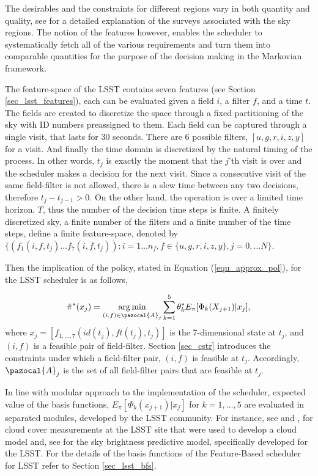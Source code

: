 \documentclass[12pt,aas_macros]{article}
\theoremstyle{definition}
\DeclareMathOperator*{\argmin}{arg\,min}
\begin{document}
The desirables and the constraints for different regions vary in both quantity and quality, see \cite{ivezic2008lsst} for a detailed explanation of the surveys associated with the sky regions. The notion of the features however, enables the scheduler to systematically fetch all of the various requirements and turn them into comparable quantities for the purpose of the decision making in the Markovian framework.

The feature-space of the LSST contains seven features (see Section \ref{sec_lsst_features}), each can be evaluated given a field $i$, a filter $f$, and a time $t$. The fields are created to discretize the space through a fixed partitioning of the sky with ID numbers preassigned to them. Each field can be captured through a single visit, that lasts for 30 seconds. There are 6 possible filters, $[u,g,r,i,z,y]$ for a visit. And finally the time domain is discretized by the natural timing of the process. In other words, $t_j$ is exactly the moment that the $j$'th visit is over and the scheduler makes a decision for the next visit. Since a consecutive visit of the same field-filter is not allowed, there is a slew time between any two decisions, therefore $t_{j} - t_{j-1} > 0$. On the other hand, the operation is over a limited time horizon, $T$, thus the number of the decision time steps is finite. A finitely discretized sky, a finite number of the filters and a finite number of the time steps, define a finite feature-space, denoted by $\{(f_1(i,f,t_j)\dots f_7(i,f,t_j)): i = 1\dots n_f, f\in \{u,g,r,i,z,y\}, j = 0,\dots N\}$.

Then the implication of the policy, stated in Equation (\ref{equ_approx_pol}), for the LSST scheduler is as follows,

\begin{equation}\label{equ_approx_pol_imp}
\tilde{\pi}^*(x_j)= \argmin_{(i,f)\in \pazocal{A}_{j}} \sum_{k=1}^5 \theta^*_k E_{\pi}[\Phi_k(X_{j+1}) | x_j]\\,
\end{equation}
where $x_j = [f_{1, \dots,7}(id(t_j),ft(t_j),t_j)]$ is the 7-dimensional state at $t_j$, and $(i,f)$ is a feasible pair of field-filter. Section \ref{sec_cstr} introduces the constraints under which a field-filter pair, $(i,f)$ is feasible at $t_{j}$. Accordingly, $\pazocal{A}_j$ is  the set of all field-filter pairs that are feasible at $t_j$.

In line with modular approach to the implementation of the scheduler, expected value of the basis functions, $E_{\pi}[\Phi_k(x_{j+1})|x_j]$ for $k=1,\dots, 5$ are evaluated in separated modules, developed by the LSST community. For instance, see \cite{sebag2008lsst} and \cite{sebag2007lsst}, for cloud cover measurements at the LSST site that were used to develop a cloud model and, see \cite{yoachim2016optical} for the sky brightness predictive model, specifically developed for the LSST. For the details of the basis functions of the Feature-Based scheduler for LSST refer to Section \ref{sec_lsst_bfs}.
\end{document}
